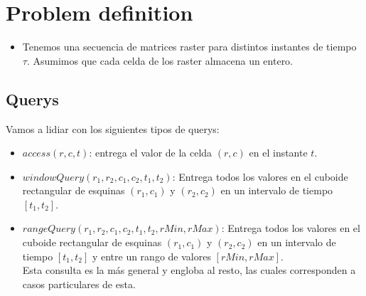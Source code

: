 \documentclass{article}
\begin{document}
\section*{Problem definition}
\begin{itemize}
  \item Tenemos una secuencia de matrices raster para distintos instantes de
    tiempo $\tau$. Asumimos que cada celda de los raster almacena un entero.
\end{itemize}

\subsection*{Querys}
Vamos a lidiar con los siguientes tipos de querys:
\begin{itemize}
  \item $access(r,c,t)$: entrega el valor de la celda $(r,c)$ en el instante $t$.
  \item $windowQuery(r_1, r_2, c_1, c_2, t_1, t_2)$: Entrega todos los valores
    en el cuboide rectangular de esquinas $(r_1, c_1)$ y $(r_2, c_2)$ en un
    intervalo de tiempo $[t_1, t_2]$.
  \item $rangeQuery(r_1, r_2, c_1, c_2, t_1, t_2, rMin, rMax)$:
    Entrega todos los valores en el cuboide rectangular de esquinas $(r_1, c_1)$
    y $(r_2, c_2)$ en un intervalo de tiempo $[t_1, t_2]$ y entre un rango de
    valores $[rMin, rMax]$.\\
    Esta consulta es la más general y engloba al resto, las cuales corresponden a
    casos particulares de esta.
\end{itemize}
\end{document}
